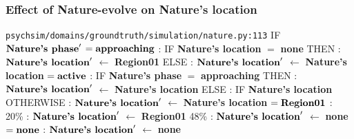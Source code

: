 \documentclass{article}%
\begin{document}
\subsubsection{Effect of Nature{-}evolve on Nature's location}%
\label{ssubsec:Effect of Nature{-}evolve on Nature's location}%
\begin{flushleft}%
\verb|psychsim/domains/groundtruth/simulation/nature.py:113|%
\linebreak%
IF %
$\mbox{\textbf{Nature's phase}} '$%
\linebreak%
\hspace*{2em}%
$= \mbox{\textbf{approaching}}$%
: %
IF %
\textbf{Nature's location}%
$=$%
\textbf{none}%
\linebreak%
\hspace*{4em}%
THEN %
: %
$\mbox{\textbf{Nature's location}} '$%
$\leftarrow$%
\textbf{Region01}%
\linebreak%
\hspace*{4em}%
ELSE %
: %
$\mbox{\textbf{Nature's location}} '$%
$\leftarrow$%
\textbf{Nature's location}%
\linebreak%
\hspace*{2em}%
$= \mbox{\textbf{active}}$%
: %
IF %
\textbf{Nature's phase}%
$=$%
\textbf{approaching}%
\linebreak%
\hspace*{4em}%
THEN %
: %
$\mbox{\textbf{Nature's location}} '$%
$\leftarrow$%
\textbf{Nature's location}%
\linebreak%
\hspace*{4em}%
ELSE %
: %
IF %
\textbf{Nature's location}%
\linebreak%
\hspace*{6em}%
OTHERWISE %
: %
$\mbox{\textbf{Nature's location}} '$%
$\leftarrow$%
\textbf{Nature's location}%
\linebreak%
\hspace*{6em}%
$= \mbox{\textbf{Region01}}$%
: %
\linebreak%
\hspace*{8em}%
20\%%
: %
$\mbox{\textbf{Nature's location}} '$%
$\leftarrow$%
\textbf{Region01}%
\linebreak%
\hspace*{8em}%
48\%%
: %
$\mbox{\textbf{Nature's location}} '$%
$\leftarrow$%
\textbf{none}%
\linebreak%
\hspace*{2em}%
$= \mbox{\textbf{none}}$%
: %
$\mbox{\textbf{Nature's location}} '$%
$\leftarrow$%
\textbf{none}%
\end{flushleft}
\end{document}
